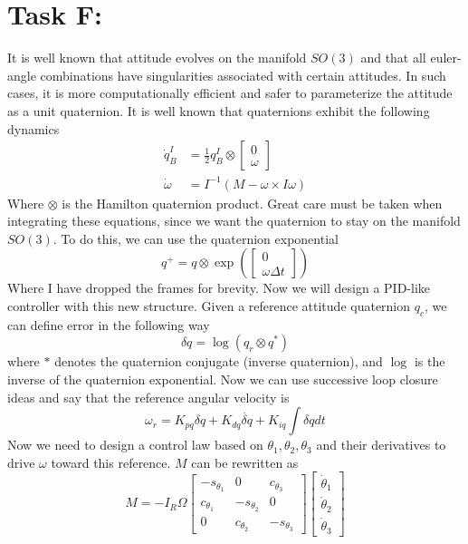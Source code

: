 \documentclass[a4paper]{article}
\begin{document}
\section*{Task F:}%
It is well known that attitude evolves on the manifold $SO(3)$ and that all euler-angle combinations have singularities associated with certain attitudes. In such cases, it is more computationally efficient and safer to parameterize the attitude as a unit quaternion. It is well known that quaternions exhibit the following dynamics
\[
  \begin{aligned}
    \dot{q}_B^I &= \frac{1}{2} q_B^I \otimes  
  \begin{bmatrix}
    0 \\
    \omega
  \end{bmatrix} \\
    \dot{\omega} &= I^{-1} \left(M  - \omega \times I \omega\right)
  \end{aligned}
\]
Where $\otimes$ is the Hamilton quaternion product. Great care must be taken when integrating these equations, since we want the quaternion to stay on the manifold $SO(3)$. To do this, we can use the quaternion exponential
\[
  q^+ = q \otimes \exp \left( \begin{bmatrix}
    0 \\
    \omega \Delta t
  \end{bmatrix} \right)
\]
Where I have dropped the frames for brevity. Now we will design a PID-like controller with this new structure. Given a reference attitude quaternion $q_c$, we can define error in the following way
\[
  \delta q = \log \left( q_r \otimes q^* \right)
\]
where $*$ denotes the quaternion conjugate (inverse quaternion), and $\log$ is the inverse of the quaternion exponential. Now we can use successive loop closure ideas and say that the reference angular velocity is
\[
  \omega_r = K_{pq} \delta q + K_{dq} \dot{\delta q} + K_{iq} \int \delta q dt
\]
Now we need to design a control law based on $\theta_1, \theta_2, \theta_3$ and their derivatives to drive $\omega$ toward this reference. $M$ can be rewritten as  
\[
  M = -I_R \Omega 
  \begin{bmatrix}
    -s_{\theta_1} & 0 & c_{\theta_3} \\
    c_{\theta_1} & -s_{\theta_2} & 0\\
    0 & c_{\theta_2} & -s_{\theta_3}
  \end{bmatrix}
  \begin{bmatrix}
    \dot{\theta}_1 \\
    \dot{\theta}_2 \\
    \dot{\theta}_3
  \end{bmatrix}
\]
\end{document}
